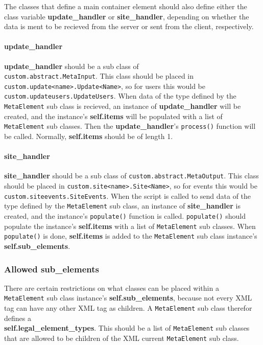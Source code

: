 The classes that define a main container element should also define either the
class variable \textbf{update\_handler} or \textbf{site\_handler}, depending on
whether the data is ment to be recieved from the server or sent from the
client, respectively. 

\paragraph{update\_handler}
\textbf{update\_handler} should be a sub class of \\
\texttt{custom.abstract.MetaInput}. This class should be placed in \\
\texttt{custom.update<name>.Update<Name>}, so for users this would be \\
\texttt{custom.updateusers.UpdateUsers}. When data of the type defined by the
\texttt{MetaElement} sub class is recieved, an instance of
\textbf{update\_handler} will be created, and the instance's
\textbf{self.items} will be populated with a list of \texttt{MetaElement} sub
classes. Then the \textbf{update\_handler}'s \texttt{process()} function will
be called.  Normally, \textbf{self.items} should be of length 1.

\paragraph{site\_handler}
\textbf{site\_handler} should be a sub class of
\texttt{custom.abstract.MetaOutput}. This class should be placed in
\texttt{custom.site<name>.Site<Name>}, so for events this would be
\texttt{custom.siteevents.SiteEvents}. When the script is called to send data
of the type defined by the \texttt{MetaElement} sub class, an instance of
\textbf{site\_handler} is created, and the instance's \texttt{populate()}
function is called. \texttt{populate()} should populate the instance's
\textbf{self.items} with a list of \texttt{MetaElement} sub classes. When
\texttt{populate()} is done, \textbf{self.items} is added to the
\texttt{MetaElement} sub class instance's \textbf{self.sub\_elements}.

\subsubsection{Allowed sub\_elements}
There are certain restrictions on what classes can be placed within a
\texttt{MetaElement} sub class instance's \textbf{self.sub\_elements}, because
not every XML tag can have any other XML tag as children. A
\texttt{MetaElement} sub class therefor defines a \\
\textbf{self.legal\_element\_types}. This should be a list of
\texttt{MetaElement} sub classes that are allowed to be children of the XML
current \texttt{MetaElement} sub class. 

